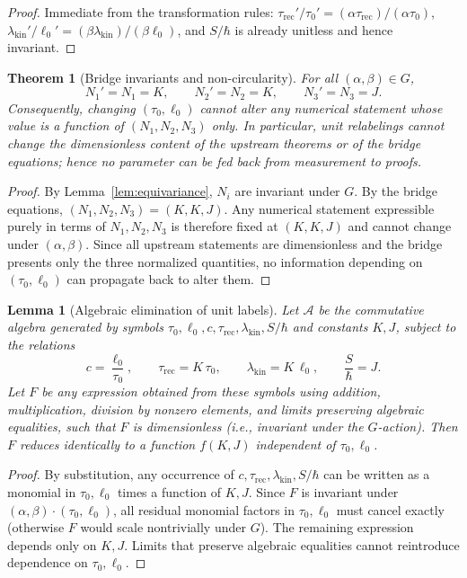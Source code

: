 \documentclass[11pt]{article}
\theoremstyle{plain}
\newtheorem{theorem}{Theorem}
\newtheorem{lemma}{Lemma}
\theoremstyle{definition}
\theoremstyle{remark}
\begin{document}
\begin{proof}
Immediate from the transformation rules: \(\tau_{\mathrm{rec}}'/\tau_{0}'=(\alpha\tau_{\mathrm{rec}})/(\alpha\tau_{0})\), \(\lambda_{\mathrm{kin}}'/\ell_{0}'=(\beta\lambda_{\mathrm{kin}})/(\beta\ell_{0})\), and \(S/\hbar\) is already unitless and hence invariant.
\end{proof}

\begin{theorem}[Bridge invariants and non-circularity]\label{thm:nocirc}
For all \((\alpha,\beta)\in G\),
\[
N_{1}'=N_{1}=K,\qquad N_{2}'=N_{2}=K,\qquad N_{3}'=N_{3}=J.
\]
Consequently, changing \((\tau_{0},\ell_{0})\) cannot alter any numerical statement whose value is a function of \((N_{1},N_{2},N_{3})\) only. In particular, unit relabelings cannot change the dimensionless content of the upstream theorems or of the bridge equations; hence no parameter can be fed back from measurement to proofs.
\end{theorem}

\begin{proof}
By Lemma~\ref{lem:equivariance}, \(N_{i}\) are invariant under \(G\). By the bridge equations, \((N_{1},N_{2},N_{3})=(K,K,J)\). Any numerical statement expressible purely in terms of \(N_{1},N_{2},N_{3}\) is therefore fixed at \((K,K,J)\) and cannot change under \((\alpha,\beta)\). Since all upstream statements are dimensionless and the bridge presents only the three normalized quantities, no information depending on \((\tau_{0},\ell_{0})\) can propagate back to alter them.
\end{proof}

\begin{lemma}[Algebraic elimination of unit labels]\label{lem:elimination}
Let \(\mathcal{A}\) be the commutative algebra generated by symbols \(\tau_{0},\ell_{0},c,\tau_{\mathrm{rec}},\lambda_{\mathrm{kin}},S/\hbar\) and constants \(K,J\), subject to the relations
\[
c=\frac{\ell_{0}}{\tau_{0}},\qquad \tau_{\mathrm{rec}}=K\,\tau_{0},\qquad \lambda_{\mathrm{kin}}=K\,\ell_{0},\qquad \frac{S}{\hbar}=J.
\]
Let \(F\) be any expression obtained from these symbols using addition, multiplication, division by nonzero elements, and limits preserving algebraic equalities, such that \(F\) is dimensionless (i.e., invariant under the \(G\)-action). Then \(F\) reduces identically to a function \(f(K,J)\) independent of \(\tau_{0},\ell_{0}\).
\end{lemma}

\begin{proof}
By substitution, any occurrence of \(c,\tau_{\mathrm{rec}},\lambda_{\mathrm{kin}},S/\hbar\) can be written as a monomial in \(\tau_{0},\ell_{0}\) times a function of \(K,J\). Since \(F\) is invariant under \((\alpha,\beta)\cdot(\tau_{0},\ell_{0})\), all residual monomial factors in \(\tau_{0},\ell_{0}\) must cancel exactly (otherwise \(F\) would scale nontrivially under \(G\)). The remaining expression depends only on \(K,J\). Limits that preserve algebraic equalities cannot reintroduce dependence on \(\tau_{0},\ell_{0}\).
\end{proof}
\end{document}
